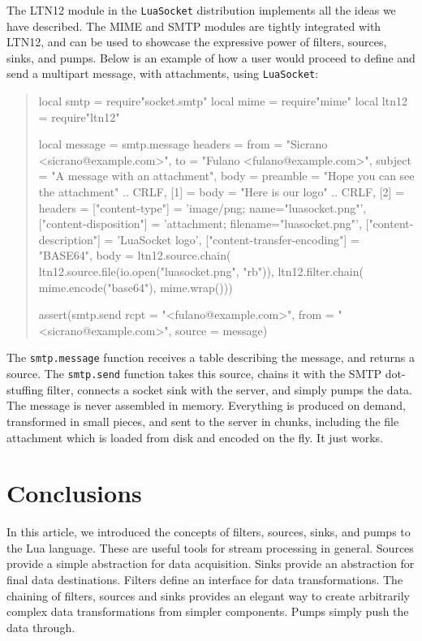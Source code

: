 \documentclass[10pt]{article}
\begin{document}
The LTN12 module in the \texttt{LuaSocket} distribution
implements all the ideas we have described. The MIME
and SMTP modules are tightly integrated with LTN12, 
and can be used to showcase the expressive power of filters,
sources, sinks, and pumps. Below is an example 
of how a user would proceed to define and send a
multipart message, with attachments, using \texttt{LuaSocket}:
\begin{quote}
\begin{mime}
local smtp = require"socket.smtp"
local mime = require"mime"
local ltn12 = require"ltn12"

local message = smtp.message{
  headers = {
    from = "Sicrano <sicrano@example.com>",
    to = "Fulano <fulano@example.com>",
    subject = "A message with an attachment"},
  body = {
    preamble = "Hope you can see the attachment" .. CRLF,
    [1] = {
      body = "Here is our logo" .. CRLF},
    [2] = {
      headers = {
        ["content-type"] = 'image/png; name="luasocket.png"',
        ["content-disposition"] = 
          'attachment; filename="luasocket.png"',
        ["content-description"] = 'LuaSocket logo',
        ["content-transfer-encoding"] = "BASE64"},
      body = ltn12.source.chain(
        ltn12.source.file(io.open("luasocket.png", "rb")),
        ltn12.filter.chain(
          mime.encode("base64"),
          mime.wrap()))}}}

assert(smtp.send{
  rcpt = "<fulano@example.com>",
  from = "<sicrano@example.com>",
  source = message})
\end{mime}
\end{quote}

The \texttt{smtp.message} function receives a table
describing the message, and returns a source. The
\texttt{smtp.send} function takes this source, chains it with the
SMTP dot-stuffing filter, connects a socket sink
with the server, and simply pumps the data. The message is never 
assembled in memory.  Everything is produced on demand, 
transformed in small pieces, and sent to the server in chunks, 
including the file attachment which is loaded from disk and 
encoded on the fly. It just works.

\section{Conclusions}

In this article, we introduced the concepts of filters,
sources, sinks, and pumps to the Lua language. These are
useful tools for stream processing in general. Sources provide
a simple abstraction for data acquisition. Sinks provide an
abstraction for final data destinations. Filters define an
interface for data transformations.  The chaining of
filters, sources and sinks provides an elegant way to create
arbitrarily complex data transformations from simpler
components. Pumps simply push the data through.  
\end{document}
